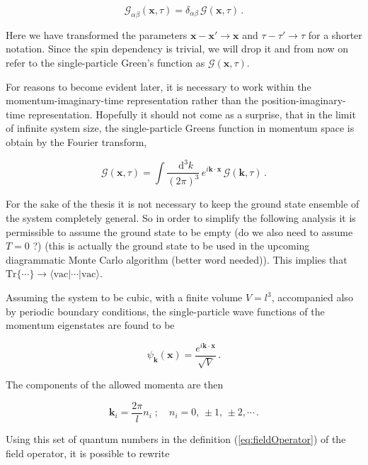 \documentclass[12pt]{report}
\renewcommand{\vec}[1]{\boldsymbol{\mathbf{#1}}}                        %
\newcommand*\diff{\mathop{}\!\mathrm{d}}
\newcommand{\Gt}{\mathcal{G}}
\newcommand{\question}[1]{{\leavevmode\color{question}#1}}
\newcommand{\todo}[1]{{\leavevmode\color{todo}#1}}
\begin{document}
\begin{equation}
	\Gt_{\alpha \beta}(\vec x, \tau) = \delta_{\alpha \beta} \, \Gt(\vec x, \tau) \,.
\end{equation}

Here we have transformed the parameters $ \vec x - \vec x' \rightarrow \vec x $ and $ \tau - \tau' \rightarrow \tau $ for a shorter notation. Since the spin dependency is trivial, we will drop it and from now on refer to the single-particle Green's function as $ \Gt (\vec x, \tau) $.

For reasons to become evident later, it is necessary to work within the momentum-imaginary-time representation rather than the position-imaginary-time representation. Hopefully it should not come as a surprise, that in the limit of infinite system size, the single-particle Greens function in momentum space is obtain by the Fourier transform,

\begin{equation}
	\label{eq:defGpt}
	\Gt (\vec x, \tau) = \int \frac{\diff^3 k}{(2 \pi)^3} \,  e^{i \vec k \cdot \vec x} \, \Gt (\vec k, \tau) \,.
\end{equation}

For the sake of the thesis it is not necessary to keep the ground state ensemble of the system completely general. So in order to simplify the following analysis it is permissible to assume the ground state to be empty \question{(do we also need to assume $ T = 0 $ ?)} (this is actually the ground state to be used in the upcoming diagrammatic Monte Carlo algorithm \todo{(better word needed)}). This implies that $ \text{Tr}\{ \cdots \} \rightarrow \langle \text{vac} | \cdots | \text{vac} \rangle $.


Assuming the system to be cubic, with a finite volume $ V = l^3 $, accompanied also by periodic boundary conditions, the single-particle wave functions of the momentum eigenstates are found to be

\begin{equation}
	\psi_{\vec k} (\vec x) = \frac{e^{i \vec k \cdot \vec x}}{\sqrt V} \,.
\end{equation}

The components of the allowed momenta are then

\begin{equation}
	\vec k_i = \frac{2\pi}{l} n_i
	\; ; \quad 
	n_i = 0, \, \pm 1, \, \pm 2, \cdots \,.
\end{equation}

Using this set of quantum numbers in the definition (\ref{eq:fieldOperator}) of the field operator, it is possible to rewrite
\end{document}
